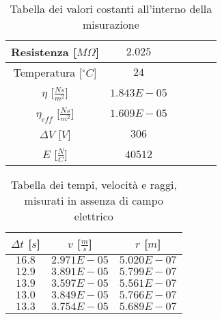 \documentclass{article}
\begin{document}
\begin{multicols}{2}

\begin{table}[H]
	\centering
	\begin{tabular}{| c | c | c | c | c | c |}
		\hline
		Resistenza [$M\Omega$] & $2.025$\\
		\hline
		Temperatura [$^\circ C$]& $24$\\
		\hline
		$\eta$ [$\frac{Ns}{m^2}$] & $1.843E-05$\\
		\hline
		$\eta_{eff}$ [$\frac{Ns}{m^2}$] & $1.609E-05$\\
		\hline
		$\Delta V$ [$V$] & $306$\\
		\hline
		$E$ [$\frac N C$] & $40512$\\
		\hline
	\end{tabular}
	\caption{Tabella dei valori costanti all'interno della misurazione}
	\label{}
\end{table}

\columnbreak

\begin{table}[H]
	\centering
	\begin{tabular}{| c | c | c |}
		\hline
		$\Delta t$ [$s$] & $v$ [$\frac ms$] & $r$ [$m$] \\
		\hline
		$16.8$ & $2.971E-05$ & $5.020E-07$ \\
		$12.9$ & $3.891E-05$ & $5.799E-07$ \\
		$13.9$ & $3.597E-05$ & $5.561E-07$ \\
		$13.0$ & $3.849E-05$ & $5.766E-07$ \\
		$13.3$ & $3.754E-05$ & $5.689E-07$ \\
		\hline
	\end{tabular}
	\caption{Tabella dei tempi, velocità e raggi, misurati in assenza di campo elettrico}
	\label{}
\end{table}
	
\end{multicols}
\end{document}
